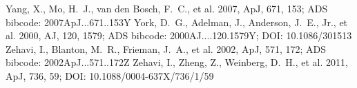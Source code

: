 \documentclass[twocolumn]{aastex631}
\begin{document}
\begin{thebibliography}{}
 Yang, X., Mo, H.~J., van den Bosch, F.~C., et al. 2007, ApJ, 671, 153; ADS bibcode: 2007ApJ...671..153Y
 York, D.~G., Adelman, J., Anderson, J.~E., Jr., et al. 2000, AJ, 120, 1579; ADS bibcode: 2000AJ....120.1579Y; DOI: 10.1086/301513
 Zehavi, I., Blanton, M.~R., Frieman, J.~A., et al. 2002, ApJ, 571, 172; ADS bibcode: 2002ApJ...571..172Z
 Zehavi, I., Zheng, Z., Weinberg, D.~H., et al. 2011, ApJ, 736, 59; DOI: 10.1088/0004-637X/736/1/59
\end{thebibliography}
\end{document}
